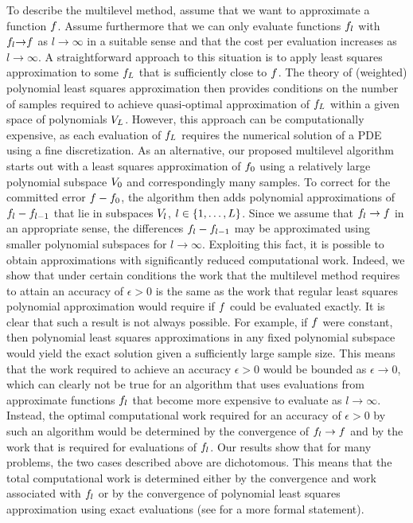 To describe the multilevel method, assume that we want to approximate a function $f$. Assume furthermore that we can only evaluate functions $f_{l}$ with $f_{l}{\rightarrow}f$ as $l\to\infty$ in a suitable sense and that the cost per evaluation increases as $l\to\infty$. A straightforward approach to this situation is to apply least squares approximation to some $f_{L}$ that is sufficiently close to $f$. The theory of (weighted) polynomial least squares approximation then provides conditions on the number of samples required to achieve quasi-optimal approximation of $f_{L}$ within a given space of polynomials $V_{L}$. However, this approach can be computationally expensive, as each evaluation of $f_{L}$ requires the numerical solution of a PDE using a fine discretization. As an alternative, our proposed multilevel algorithm starts out with a least squares approximation of $f_{0}$ using a relatively large polynomial subspace $V_0$ and correspondingly many samples. To correct for the committed error $f-f_{0}$, the algorithm then adds polynomial approximations of $f_{l}-f_{l-1}$ that lie in subspaces $V_l$, $l\in\{1,\dots,L\}$. 
Since we assume that $f_{l}\to f$ in an appropriate sense, the differences $f_{l}-f_{l-1}$ may be approximated using smaller polynomial subspaces for $l\to\infty$. Exploiting this fact, it is possible to obtain approximations with significantly reduced computational work. 
Indeed, we show that under certain conditions the work that the multilevel method requires to attain an accuracy of  $\epsilon>0$ is the same as the work that regular least squares polynomial approximation would require if $f$ could be evaluated exactly. It is clear that such a result is not always possible. For example, if $f$ were constant, then polynomial least squares approximations in any fixed polynomial subspace would yield the exact solution given a sufficiently large sample size. This means that the work required to achieve an accuracy $\epsilon>0$ would be bounded as $\epsilon\to 0$, which can clearly not be true for an algorithm that uses evaluations from approximate functions $f_l$ that become more expensive to evaluate as $l\to\infty$. Instead, the optimal computational work required for an accuracy of $\epsilon>0$ by such an algorithm would be determined by the convergence of $f_l\to f$ and by the work that is required for evaluations of $f_l$. 
Our results show that for many problems, the two cases described above are dichotomous. This means that the total computational work is determined either by the convergence and work associated with $f_{l}$ or by the convergence of polynomial least squares approximation using exact evaluations (see  for a more formal statement). \\


